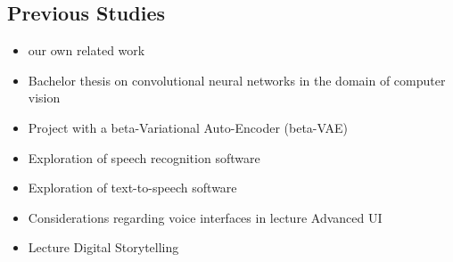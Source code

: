 \subsection{Previous Studies}

\begin{itemize}
    \item our own related work 
    \item Bachelor thesis on convolutional neural networks in the domain of computer vision
    \item Project with a beta-Variational Auto-Encoder (beta-VAE)
    \item Exploration of speech recognition software
    \item Exploration of text-to-speech software
    \item Considerations regarding voice interfaces in lecture Advanced UI
    \item Lecture Digital Storytelling
\end{itemize}

